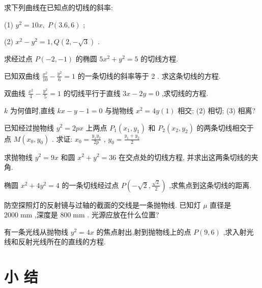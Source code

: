 \documentclass[lang=cn,newtx,10.5pt,scheme=chinese]{elegantbook}
\begin{document}
\begin{problemset}[习 题 九]

\item 求下列曲线在已知点的切线的斜率:

(1) \({y}^{2} = {10x},\;P\left( {{3.6},6}\right)\) ;

(2) \({x}^{2} - {y}^{2} = 1,Q\left( {2, - \sqrt{3}}\right)\) .

\item 求经过点 \(P\left( {-2, - 1}\right)\) 的椭圆 \(5{x}^{2} + {y}^{2} = 5\) 的切线方程.

\item 已知双曲线 \(\frac{{x}^{2}}{10} - \frac{{y}^{2}}{6} = 1\) 的一条切线的斜率等于 2 . 求这条切线的方程.

\item 双曲线 \(\frac{{x}^{2}}{4} - \frac{{y}^{2}}{5} = 1\) 的切线平行于直线 \({3x} - {2y} = 0\) ,求切线的方程.

\item \(k\) 为何值时,直线 \({kx} - y - 1 = 0\) 与抛物线 \({x}^{2} = {4y}\left( 1\right)\) 相交; (2) 相切; (3) 相离?

\item 已知经过抛物线 \({y}^{2} = {2px}\) 上两点 \({P}_{1}\left( {{x}_{1},{y}_{1}}\right)\) 和 \({P}_{2}\left( {{x}_{2},{y}_{2}}\right)\) 的两条切线相交于点 \(M\left( {{x}_{0},{y}_{0}}\right)\) . 求证: \({x}_{0} = \frac{{y}_{1}{y}_{2}}{2p}\) , \({y}_{0} = \frac{{y}_{1} + {y}_{2}}{2}\)

\item 求抛物线 \({y}^{2} = {9x}\) 和圆 \({x}^{2} + {y}^{2} = {36}\) 在交点处的切线方程, 并求出这两条切线的夹角.

\item 椭圆 \({x}^{2} + 4{y}^{2} = 4\) 的一条切线经过点 \(P\left( {-\sqrt{2},\frac{\sqrt{2}}{2}}\right)\) ,求焦点到这条切线的距离.

\item 防空探照灯的反射镜与过轴的截面的交线是一条抛物线. 已知灯 \(\mu\) 直径是 \({2000}\mathrm{\;{mm}}\) ,深度是 \({800}\mathrm{\;{mm}}\) . 光源应放在什么位置?

\item 有一条光线从抛物线 \({y}^{2} = {4x}\) 的焦点射出,射到抛物线上的点 \(P\left( {9,6}\right)\) ,求入射光线和反射光线所在的直线的方程.
\end{problemset}

\chapter*{小 结}
\end{document}
